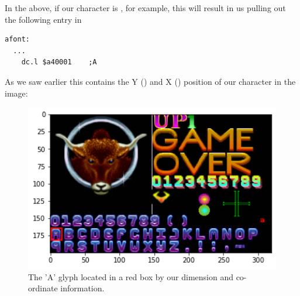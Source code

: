 In the above, if our character is , for example, this will result in us pulling out the following entry in 
\begin{lstlisting}
afont:
  ...
	dc.l $a40001	;A
\end{lstlisting}

As we saw earlier this contains the Y () and X () position of our  character in the  image:

\begin{figure}[H]
    \centering
    \begin{adjustbox}{width=7.5cm,center}
      \includegraphics[width=12cm]{src/characters/plot.png}%
    \end{adjustbox}
\caption{The 'A' glyph located in a red box by our dimension and co-ordinate information.}
\end{figure}
